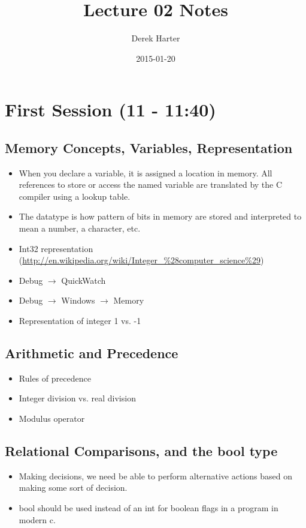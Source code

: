 \documentclass[11pt]{article}
\title{Lecture 02 Notes}
\author{Derek Harter}
\date{2015-01-20}
\begin{document}
\maketitle


\section{First Session (11 - 11:40)}
\label{sec-1}
\subsection{Memory Concepts, Variables, Representation}
\label{sec-1-1}


\begin{itemize}
\item When you declare a variable, it is assigned a location in memory.
  All references to store or access the named variable are translated
  by the C compiler using a lookup table.
\item The datatype is how pattern of bits in memory are stored and
  interpreted to mean a number, a character, etc.
\item Int32 representation (\href{http://en.wikipedia.org/wiki/Integer_%28computer_science%29}{http://en.wikipedia.org/wiki/Integer\_\%28computer\_science\%29})
\item Debug $\rightarrow$ QuickWatch
\item Debug $\rightarrow$ Windows $\rightarrow$ Memory
\item Representation of integer 1 vs. -1
\end{itemize}
\subsection{Arithmetic and Precedence}
\label{sec-1-2}

\begin{itemize}
\item Rules of precedence
\item Integer division vs. real division
\item Modulus operator
\end{itemize}
\subsection{Relational Comparisons, and the bool type}
\label{sec-1-3}

\begin{itemize}
\item Making decisions, we need be able to perform alternative actions
  based on making some sort of decision.
\item bool should be used instead of an int for boolean flags in a program in modern c.
\end{itemize}
\end{document}
